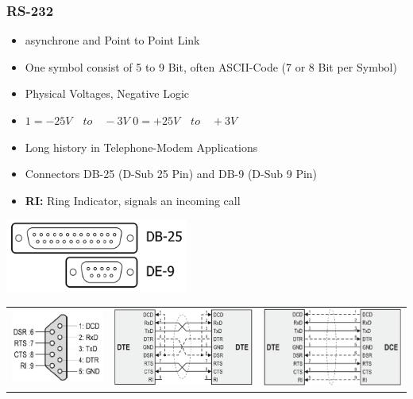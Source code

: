 \subsubsection{RS-232}
\begin{minipage}{12cm}
	\begin{itemize}
		\item asynchrone and Point to Point Link
		\item One symbol consist of 5 to 9 Bit, often \acs{ASCII}-Code\newline
        (7 or 8 Bit per Symbol)
		\item Physical Voltages, Negative Logic
		\item $1=-25V \quad to \quad -3V$\newline
		$0=+25V\quad to \quad +3V$
		\item Long history in Telephone-Modem Applications
		\item Connectors DB-25 (D-Sub 25 Pin) and DB-9 (D-Sub 9 Pin)
		\item\textbf{RI: }Ring Indicator, signals an incoming call
	\end{itemize}
\end{minipage}
\begin{minipage}{6cm}
	\includegraphics[width=6cm]{images/Connectors_RS}
\end{minipage}
\clearpage
\begin{tabular}{ccc}
	\includegraphics[width=4cm]{images/pin_RS} & \includegraphics[width=6cm]{images/cable2_RS} & \includegraphics[width=6cm]{images/cable_RS}\\
\end{tabular}
